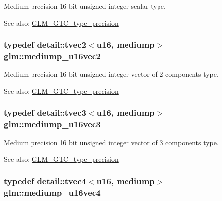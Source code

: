 Medium precision 16 bit unsigned integer scalar type. \begin{Desc}
\item[See also:]\hyperlink{group__gtc__type__precision}{GLM\_\-GTC\_\-type\_\-precision} \end{Desc}
\hypertarget{group__gtc__type__precision_g93fe5ddc21391f0334eb3a60b76c390b}{
\subsubsection[mediump\_\-u16vec2]{\setlength{\rightskip}{0pt plus 5cm}typedef detail::tvec2$<$u16, mediump$>$ {\bf glm::mediump\_\-u16vec2}}}
\label{group__gtc__type__precision_g93fe5ddc21391f0334eb3a60b76c390b}


Medium precision 16 bit unsigned integer vector of 2 components type. \begin{Desc}
\item[See also:]\hyperlink{group__gtc__type__precision}{GLM\_\-GTC\_\-type\_\-precision} \end{Desc}
\hypertarget{group__gtc__type__precision_g82dbfd263ced8d03577008a3ef096598}{
\subsubsection[mediump\_\-u16vec3]{\setlength{\rightskip}{0pt plus 5cm}typedef detail::tvec3$<$u16, mediump$>$ {\bf glm::mediump\_\-u16vec3}}}
\label{group__gtc__type__precision_g82dbfd263ced8d03577008a3ef096598}


Medium precision 16 bit unsigned integer vector of 3 components type. \begin{Desc}
\item[See also:]\hyperlink{group__gtc__type__precision}{GLM\_\-GTC\_\-type\_\-precision} \end{Desc}
\hypertarget{group__gtc__type__precision_gad8b540f4231f69823c39fe9dfcb945a}{
\subsubsection[mediump\_\-u16vec4]{\setlength{\rightskip}{0pt plus 5cm}typedef detail::tvec4$<$u16, mediump$>$ {\bf glm::mediump\_\-u16vec4}}}
\label{group__gtc__type__precision_gad8b540f4231f69823c39fe9dfcb945a}


